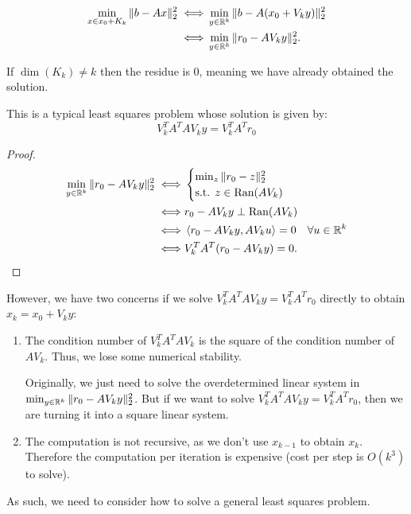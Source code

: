 \documentclass[../main/main.tex]{subfiles}
\begin{document}
\begin{align*}
  \min _{x\in x_{0}+K_{k}}\|b-Ax\|_{2}^2 \iff&  \min _{y\in \mathbb{R} ^{k}} \|b-A(x_{0}+V_{k}y)\|_{2}^2\\
  \iff&  \min_{y\in \mathbb{R} ^{k}} \|r_{0}-AV_{k}y\|_{2}^2
  .\end{align*}
\begin{remark}
If $\dim(K_{k})\neq k$ then the residue is 0, meaning we have already obtained the solution.
\end{remark}
This is a typical least squares problem whose solution is given by: \[
V_{k}^{T}A^{T}AV_{k}y = V_{k}^{T}A^{T}r_{0}
\]
\begin{proof}
  \begin{align*}
\min_{y\in \mathbb{R} ^{k}} \|r_{0}-AV_{k}y\|_{2}^2 \iff&  \begin{cases}
  \min_{z} \|r_{0}-z\|^2_{2}\\
  \text{s.t. }z\in \text{Ran}(AV_{k})
\end{cases}\\
   \iff  & r_{0}-AV_{k}y \perp \text{Ran}(AV_{k})\\
   \iff  & \left\langle{r_{0}-AV_{k}y},{AV_{k}u}\right\rangle = 0 \quad \forall  u \in \mathbb{R} ^{k}\\
   \iff  & V_{k}^{T}A^{T}(r_{0}-AV_{k}y) = 0
    .\end{align*}
\end{proof}
However, we have two concerns if we solve $V_{k}^{T}A^{T}AV_{k}y=V_{k}^{T}A^{T}r_{0}$ directly to obtain $x_{k}=x_{0}+V_{k}y$:
\begin{enumerate}
\item The condition number of $V_{k}^{T}A^{T}AV_{k}$ is the square of the condition number of $AV_{k}$. Thus, we lose some numerical stability.
        \begin{remark}
Originally, we just need to solve the overdetermined linear system in $ \min_{y\in \mathbb{R} ^{k}} \|r_{0}-AV_{k}y\|_{2}^2$. But if we want to solve $V_{k}^{T}A^{T}AV_{k}y=V_{k}^{T}A^{T}r_{0}$, then we are turning it into a square linear system.
        \end{remark}
\item The computation is not recursive, as we don't use $x_{k-1}$ to obtain $x_{k}$. Therefore the computation per iteration is expensive (cost per step is $O(k^{3})$ to solve).
\end{enumerate}
As such, we need to consider how to solve a general least squares problem.
\end{document}
